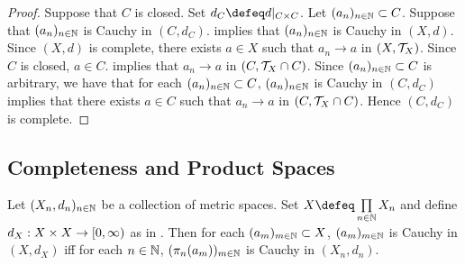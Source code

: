 \documentclass{book}
\begin{document}
\begin{proof}
	Suppose that $C$ is closed. Set $d_C \defeq d|_{C \times C}$. Let $(a_n)_{n \in \mathbb{N}} \subset C$. Suppose that $(a_n)_{n \in \mathbb{N}}$ is Cauchy in $(C, d_C)$.  implies that $(a_n)_{n \in \mathbb{N}}$ is Cauchy in $(X, d)$. Since $(X, d)$ is complete, there exists $a \in X$ such that $a_n \rightarrow a$ in $(X, \mathcal{T}_X)$. Since $C$ is closed, $a \in C$.  implies that $a_n \rightarrow a$ in $(C, \mathcal{T}_X \cap C)$. Since $(a_n)_{n \in \mathbb{N}} \subset C$ is arbitrary, we have that for each $(a_n)_{n \in \mathbb{N}} \subset C$, $(a_n)_{n \in \mathbb{N}}$ is Cauchy in $(C, d_C)$ implies that there exists $a \in C$ such that $a_n \rightarrow a$ in $(C, \mathcal{T}_X \cap C)$. Hence $(C, d_C)$ is complete. 
\end{proof}


















\subsection{Completeness and Product Spaces}

\begin{ex} 
	Let $(X_n, d_n)_{n \in \mathbb{N}}$ be a collection of metric spaces. Set $X \defeq \prod\limits_{n \in \N} X_n$ and define $d_X: X \times X \rightarrow [0,\infty)$ as in . Then for each $(a_m)_{m \in \mathbb{N}} \subset X$, $(a_m)_{m \in \mathbb{N}}$ is Cauchy in $(X, d_X)$ iff for each $n \in \mathbb{N}$, $(\pi_n(a_m))_{m \in \mathbb{N}}$ is Cauchy in $(X_n, d_n)$.
\end{ex}
\end{document}
